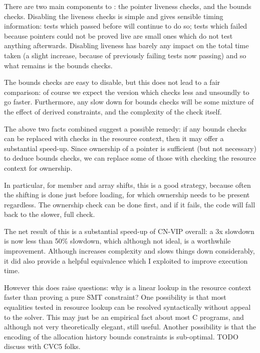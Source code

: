 
There are two main components to : the pointer liveness checks, and
the bounds checks. Disabling the liveness checks is simple and gives sensible
timing information: tests which passed before will continue to do so; tests
which failed because pointers could not be proved live are small ones which do
not test anything afterwards. Disabling liveness has barely any impact on the
total time taken (a slight increase, because of previously failing tests now
passing) and so what remains is the bounds checks.

The bounds checks are easy to disable, but this does not lead to a fair
comparison: of course we expect the version which checks less and unsoundly to
go faster. Furthermore, any slow down for bounds checks will be some mixture of
the effect of derived constraints, and the complexity of the check itself.

The above two facts combined
suggest a possible remedy: if any bounds checks can be replaced with checks in
the resource context, then it may offer a substantial speed-up. Since ownership
of a pointer is sufficient (but not necessary) to deduce bounds checks, we can
replace some of those with checking the resource context for ownership.

In particular, for member and array shifts, this is a good strategy, because
often the shifting is done just before loading, for which ownership needs to be
present regardless. The ownership check can be done first, and if it fails, the
code will fall back to the slower, full check.

The net result of this is a substantial speed-up of CN-VIP overall: a 3x
slowdown is now less than 50\% slowdown, which although not ideal, is a
worthwhile improvement. Although  increases complexity and slows
things down considerably, it did also provide a helpful equivalence which I
exploited to improve execution time.

However this does raise questions: why is a linear lookup in the resource
context faster than proving a pure SMT constraint? One possibility is that most
equalities tested in resource lookup can be resolved syntactically without
appeal to the solver. This may just be an empirical fact about most C programs,
and although not very theoretically elegant, still useful. Another possibility
is that the encoding of the allocation history bounds constraints is
sub-optimal. TODO discuss with CVC5 folks.

